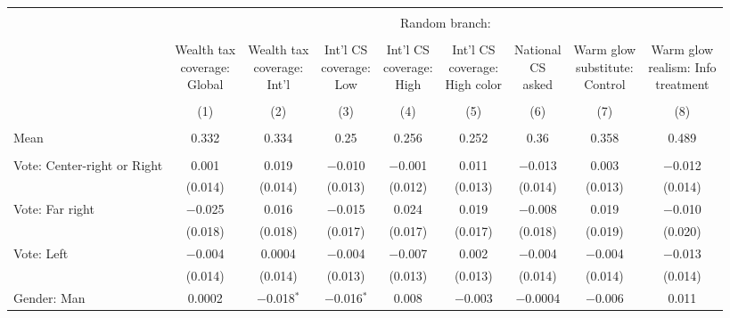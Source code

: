 
\begin{tabular}{@{\extracolsep{5pt}}lcccccccc} 
\\[-1.8ex]\hline 
\hline \\[-1.8ex] 
 & \multicolumn{8}{c}{Random branch:} \\ 
\cline{2-9} 
\\[-1.8ex] & \makecell{Wealth tax\\coverage:\\Global} & \makecell{Wealth tax\\coverage:\\Int'l} & \makecell{Int'l CS\\coverage:\\Low} & \makecell{Int'l CS\\coverage:\\High} & \makecell{Int'l CS\\coverage:\\High color} & \makecell{National\\CS\\asked} & \makecell{Warm glow\\substitute:\\Control} & \makecell{Warm glow\\realism: Info\\treatment} \\ 
\\[-1.8ex] & (1) & (2) & (3) & (4) & (5) & (6) & (7) & (8)\\ 
\hline \\[-1.8ex] 
Mean & 0.332 & 0.334 & 0.25 & 0.256 & 0.252 & 0.36 & 0.358 & 0.489  \\ \hline \\[-1.8ex]
 Vote: Center\mbox{-}right or Right & 0.001 & 0.019 & $-$0.010 & $-$0.001 & 0.011 & $-$0.013 & 0.003 & $-$0.012 \\ 
  & (0.014) & (0.014) & (0.013) & (0.012) & (0.013) & (0.014) & (0.013) & (0.014) \\ 
  Vote: Far right & $-$0.025 & 0.016 & $-$0.015 & 0.024 & 0.019 & $-$0.008 & 0.019 & $-$0.010 \\ 
  & (0.018) & (0.018) & (0.017) & (0.017) & (0.017) & (0.018) & (0.019) & (0.020) \\ 
  Vote: Left & $-$0.004 & 0.0004 & $-$0.004 & $-$0.007 & 0.002 & $-$0.004 & $-$0.004 & $-$0.013 \\ 
  & (0.014) & (0.014) & (0.013) & (0.013) & (0.013) & (0.014) & (0.014) & (0.014) \\ 
  Gender: Man & 0.0002 & $-$0.018$^{*}$ & $-$0.016$^{*}$ & 0.008 & $-$0.003 & $-$0.0004 & $-$0.006 & 0.011 \\ 

\end{tabular}
